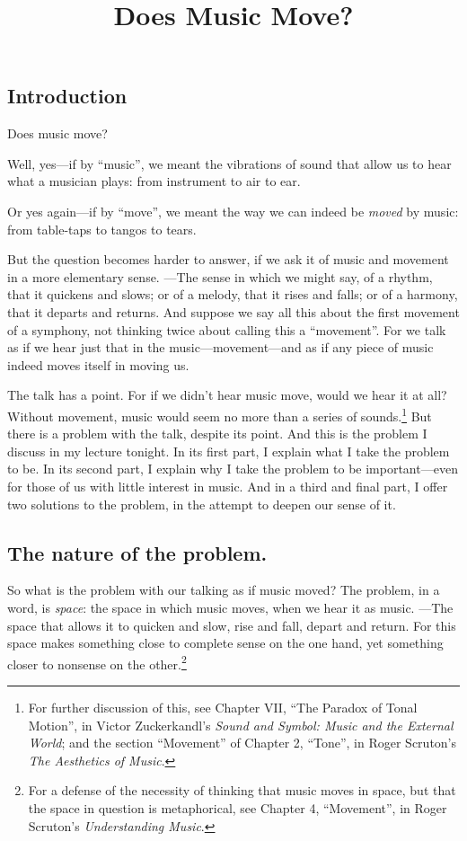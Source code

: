 \documentclass[12pt]{memoir}
\title{Does Music Move?}
\author{}
\date{}
\begin{document}
\maketitle

\subsection{Introduction}

Does music move?

Well, yes---if by ``music'', we meant the vibrations of sound that allow
us to hear what a musician plays: from instrument to air to ear.

Or yes again---if by ``move'', we meant the way we can indeed be
\emph{moved} by music: from table-taps to tangos to tears.

But the question becomes harder to answer, if we ask it of music and
movement in a more elementary sense. ---The sense in which we might say,
of a rhythm, that it quickens and slows; or of a melody, that it rises
and falls; or of a harmony, that it departs and returns. And suppose we
say all this about the first movement of a symphony, not thinking twice
about calling this a ``movement''. For we talk as if we hear just that
in the music---movement---and as if any piece of music indeed moves
itself in moving us.

The talk has a point. For if we didn't hear
music move, would we hear it at all? Without
movement, music would seem no more than a series
of sounds.\footnote{For further discussion of
this, see Chapter VII, ``The Paradox of Tonal
Motion'', in Victor Zuckerkandl's \emph{Sound and
Symbol: Music and the External World}; and the
section ``Movement'' of Chapter 2, ``Tone'', in
Roger Scruton's \emph{The Aesthetics of Music}.}
But there is a problem with the talk, despite
its point. And this is the problem I discuss in
my lecture tonight. In its first part, I explain
what I take the problem to be. In its second
part, I explain why I take the problem to be
important---even for those of us with little
interest in music. And in a third and final part,
I offer two solutions to the problem, in the
attempt to deepen our sense of it.

\subsection{The nature of the problem.}

So what is the problem with our talking as if music moved? The problem,
in a word, is \emph{space}: the space in which music moves, when we hear
it as music. ---The space that allows it to quicken and slow, rise and
fall, depart and return. For this space makes something close to
complete sense on the one hand, yet something closer to
nonsense on the other.\footnote{For a defense of the
  necessity of thinking that music moves in space, but that the space in
  question is metaphorical, see Chapter 4, ``Movement'', in Roger
  Scruton's \emph{Understanding Music}.}
\end{document}
